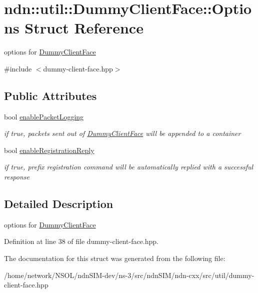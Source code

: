 \hypertarget{structndn_1_1util_1_1DummyClientFace_1_1Options}{}\section{ndn\+:\+:util\+:\+:Dummy\+Client\+Face\+:\+:Options Struct Reference}
\label{structndn_1_1util_1_1DummyClientFace_1_1Options}


options for \hyperlink{classndn_1_1util_1_1DummyClientFace}{Dummy\+Client\+Face}  




{\ttfamily \#include $<$dummy-\/client-\/face.\+hpp$>$}

\subsection*{Public Attributes}
\begin{DoxyCompactItemize}
\item 
bool \hyperlink{structndn_1_1util_1_1DummyClientFace_1_1Options_aac67e8f8155a1f03d22972d2f7083dce}{enable\+Packet\+Logging}\hypertarget{structndn_1_1util_1_1DummyClientFace_1_1Options_aac67e8f8155a1f03d22972d2f7083dce}{}\label{structndn_1_1util_1_1DummyClientFace_1_1Options_aac67e8f8155a1f03d22972d2f7083dce}

\begin{DoxyCompactList}\small\item\em if true, packets sent out of \hyperlink{classndn_1_1util_1_1DummyClientFace}{Dummy\+Client\+Face} will be appended to a container \end{DoxyCompactList}\item 
bool \hyperlink{structndn_1_1util_1_1DummyClientFace_1_1Options_af776feab55e48d32d842514e0cb20d13}{enable\+Registration\+Reply}\hypertarget{structndn_1_1util_1_1DummyClientFace_1_1Options_af776feab55e48d32d842514e0cb20d13}{}\label{structndn_1_1util_1_1DummyClientFace_1_1Options_af776feab55e48d32d842514e0cb20d13}

\begin{DoxyCompactList}\small\item\em if true, prefix registration command will be automatically replied with a successful response \end{DoxyCompactList}\end{DoxyCompactItemize}


\subsection{Detailed Description}
options for \hyperlink{classndn_1_1util_1_1DummyClientFace}{Dummy\+Client\+Face} 

Definition at line 38 of file dummy-\/client-\/face.\+hpp.



The documentation for this struct was generated from the following file\+:\begin{DoxyCompactItemize}
\item 
/home/network/\+N\+S\+O\+L/ndn\+S\+I\+M-\/dev/ns-\/3/src/ndn\+S\+I\+M/ndn-\/cxx/src/util/dummy-\/client-\/face.\+hpp\end{DoxyCompactItemize}
